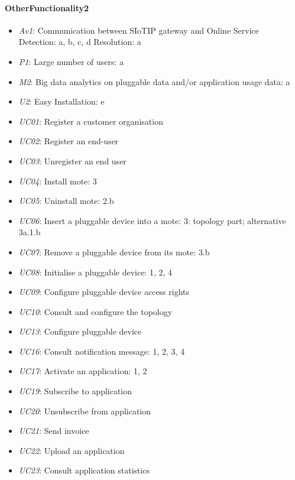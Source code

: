     \paragraph{OtherFunctionality2}
        \begin{itemize}
            \item \emph{Av1}: Communication between SIoTIP gateway and Online Service \\
                               Detection: a, b, c, d
                               Resolution: a
           	\item \emph{P1}: Large number of users: a
            \item \emph{M2}: Big data analytics on pluggable data and/or application usage data: a
            \item \emph{U2}: Easy Installation: e
            \item \emph{UC01}: Register a customer organisation
            \item \emph{UC02}: Register an end-user
            \item \emph{UC03}: Unregister an end user
            \item \emph{UC04}: Install mote: 3
            \item \emph{UC05}: Uninstall mote: 2.b
            \item \emph{UC06}: Insert a pluggable device into a mote: 3: topology part; alternative 3a.1.b
            \item \emph{UC07}: Remove a pluggable device from its mote: 3.b
            \item \emph{UC08}: Initialise a pluggable device: 1, 2, 4
            \item \emph{UC09}: Configure pluggable device access rights
            \item \emph{UC10}: Consult and configure the topology
            \item \emph{UC13}: Configure pluggable device
            \item \emph{UC16}: Consult notification message: 1, 2, 3, 4
            \item \emph{UC17}: Activate an application: 1, 2
            \item \emph{UC19}: Subscribe to application
            \item \emph{UC20}: Unsubscribe from application
            \item \emph{UC21}: Send invoice
            \item \emph{UC22}: Upload an application
            \item \emph{UC23}: Consult application statistics

\end{itemize}
